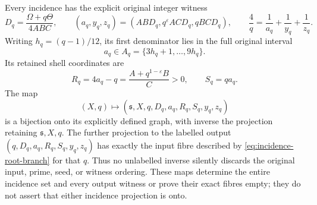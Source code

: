 \begin{theorem}
Every incidence has the explicit original integer witness
\begin{equation}\label{eq:incidence-witness}
 D_q=\frac{\Omega+q\Theta}{4ABC},\qquad
 (a_q,y_q,z_q)=(ABD_q,q^\varepsilon ACD_q,qBCD_q),
 \qquad \frac4q=\frac1{a_q}+\frac1{y_q}+\frac1{z_q}.
\end{equation}
Writing \(h_q=(q-1)/12\), its first denominator lies in the full
original interval
\[
 a_q\in A_q=\{3h_q+1,\ldots,9h_q\}.
\]
Its retained shell coordinates are
\[
 R_q=4a_q-q=\frac{A+q^{1-\varepsilon}B}{C}>0,
 \qquad S_q=qa_q.
\]
The map
\[
 (X,q)\longmapsto
 (\mathfrak s,X,q,D_q,a_q,R_q,S_q,y_q,z_q)
\]
is a bijection onto its explicitly defined graph, with inverse
the projection retaining \(\mathfrak s,X,q\).
The further projection to the labelled output
\((q,D_q,a_q,R_q,S_q,y_q,z_q)\) has exactly the input fibre
described by \eqref{eq:incidence-root-branch} for that \(q\).
Thus no unlabelled inverse silently discards the original input,
prime, seed, or witness ordering.  These maps determine the entire
incidence set and every output witness or prove their exact fibres
empty; they do not assert that either incidence projection is onto.
\end{theorem}
